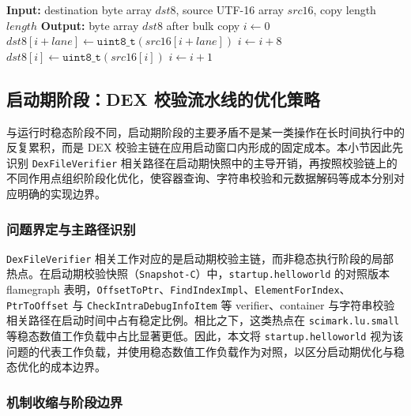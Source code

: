 \begin{algorithm}[htbp]
    \small
    \caption{字符串热路径 8 路批量搬移机制的复制内核}
    \label{alg:scheme2-bulk-copy-helper}
    \begin{algorithmic}[1]
        \State \textbf{Input:} destination byte array $dst8$, source UTF-16 array $src16$, copy length $length$
        \State \textbf{Output:} byte array $dst8$ after bulk copy
        \State $i \gets 0$
                \State $dst8[i + lane] \gets \texttt{uint8\_t}(src16[i + lane])$
            \EndFor
            \State $i \gets i + 8$
        \EndWhile
            \State $dst8[i] \gets \texttt{uint8\_t}(src16[i])$
            \State $i \gets i + 1$
        \EndWhile
    \end{algorithmic}
\end{algorithm}

\subsection{启动期阶段：DEX 校验流水线的优化策略}

与运行时稳态阶段不同，启动期阶段的主要矛盾不是某一类操作在长时间执行中的反复累积，而是 DEX 校验主链在应用启动窗口内形成的固定成本。本小节因此先识别 \texttt{DexFileVerifier} 相关路径在启动期快照中的主导开销，再按照校验链上的不同作用点组织阶段化优化，使容器查询、字符串校验和元数据解码等成本分别对应明确的实现边界。

\subsubsection{问题界定与主路径识别}

\texttt{DexFileVerifier} 相关工作对应的是启动期校验主链，而非稳态执行阶段的局部热点。在启动期校验快照（\texttt{Snapshot-C}）中，\texttt{startup.helloworld} 的对照版本 flamegraph 表明，\texttt{OffsetToPtr}、\texttt{FindIndexImpl}、\texttt{ElementForIndex}、\texttt{PtrToOffset} 与 \texttt{CheckIntraDebugInfoItem} 等 verifier、container 与字符串校验相关路径在启动时间中占有稳定比例。相比之下，这类热点在 \texttt{scimark.lu.small} 等稳态数值工作负载中占比显著更低。因此，本文将 \texttt{startup.helloworld} 视为该问题的代表工作负载，并使用稳态数值工作负载作为对照，以区分启动期优化与稳态优化的成本边界。

\subsubsection{机制收缩与阶段边界}

